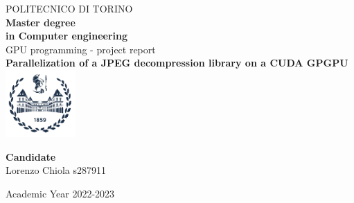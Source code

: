 \begin{titlepage}

\begin{center}

{\huge POLITECNICO DI TORINO}\\[1.5cm]
\textbf{Master degree\\in Computer engineering}\\[3cm]

{\Large GPU programming - project report}\\[1cm]
\textbf{\LARGE Parallelization of a JPEG decompression library on a CUDA GPGPU }\\[2cm]
\includegraphics[width=0.2\textwidth]{./Pictures/logo_polito_2021.jpg}
\vspace{4cm}


\begin{minipage}{0.85\textwidth}
\begin{flushleft}\large
\textbf{Candidate}\\
Lorenzo Chiola s287911\\

\end{flushleft}
\end{minipage}

\vfill

Academic Year 2022-2023
\end{center}

\restoregeometry %

\end{titlepage}